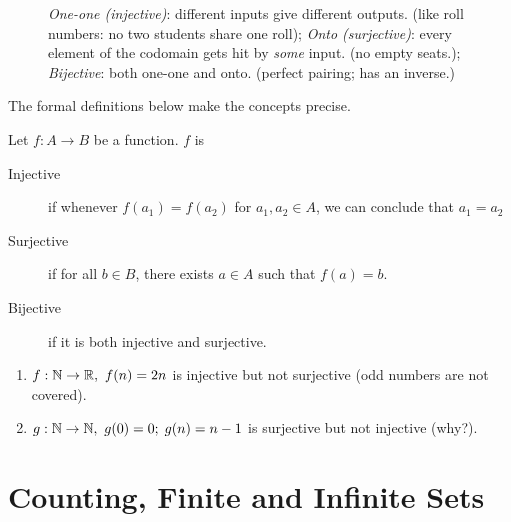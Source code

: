 \begin{figure}
\begin{center}
\end{center}
\caption{{\em One-one (injective)}: different inputs give different outputs. (like roll numbers: no two students share one roll); {\em Onto (surjective)}: every element of the codomain gets hit by \emph{some} input. (no empty seats.); {\em Bijective}: both one-one and onto. (perfect pairing; has an inverse.)}
\end{figure}


The formal definitions below make the concepts precise.

Let $f:A \to B$ be a function. $f$ is 
\begin{description}
  \item[Injective]  if whenever  $f(a_1)=f(a_2)$ for $a_1, a_2 \in A$, we can conclude that $a_1 = a_2$
  \item[Surjective]  if for all $b \in B$, there exists $a \in A$ such that $f(a)=b$.
  \item[Bijective] if it is both injective and surjective.
\end{description}

\begin{example}
\begin{enumerate}
  \item $f:\mathbb{N} \to \mathbb{R},\ f(n)=2n$ is injective but not surjective (odd numbers are not covered).
  \item $g:\mathbb{N} \to\mathbb{N},\ g(0)=0;\;g(n)=n-1$  is surjective but not injective (why?).
 \end{enumerate}
 \end{example}
 
 \section{Counting, Finite and Infinite Sets}

